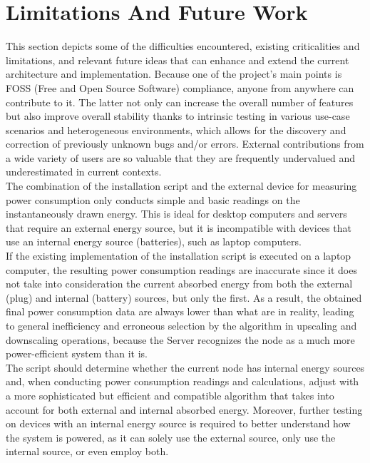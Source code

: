 \section{Limitations And Future Work}
\label{sec:conclusions_limitations_and_future_works}

This section depicts some of the difficulties encountered, existing criticalities
and limitations, and relevant future ideas that can enhance and extend the
current architecture and implementation. Because one of the project's main points
is FOSS (Free and Open Source Software) compliance, anyone from anywhere can
contribute to it. The latter not only can increase the overall number of features
but also improve overall stability thanks to intrinsic testing in various use-case
scenarios and heterogeneous environments, which allows for the discovery and
correction of previously unknown bugs and/or errors. External contributions from
a wide variety of users are so valuable that they are frequently undervalued and
underestimated in current contexts. \\ %

The combination of the installation script and the external device for measuring
power consumption only conducts simple and basic readings on the instantaneously
drawn energy. This is ideal for desktop computers and servers that require an external
energy source, but it is incompatible with devices that use an internal energy
source (batteries), such as laptop computers. \\ %
If the existing implementation of the installation script is executed on a laptop
computer, the resulting power consumption readings are inaccurate since it does
not take into consideration the current absorbed energy from both the external (plug)
and internal (battery) sources, but only the first. As a result, the obtained final
power consumption data are always lower than what are in reality, leading to
general inefficiency and erroneous selection by the algorithm in upscaling and
downscaling operations, because the Server recognizes the node as a much more power-efficient
system than it is. \\ %
The script should determine whether the current node has internal energy sources
and, when conducting power consumption readings and calculations, adjust with a more
sophisticated but efficient and compatible algorithm that takes into account for
both external and internal absorbed energy. Moreover, further testing on devices
with an internal energy source is required to better understand how the system is
powered, as it can solely use the external source, only use the internal source,
or even employ both. \\ %

